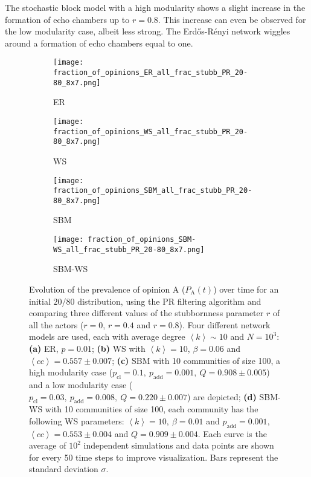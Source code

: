 \documentclass[11 pt , letterpaper , twoside , openright]{book}
\begin{document}
\newline
The stochastic block model with a high modularity shows a slight increase in the formation of echo chambers up to $r = 0.8$. This increase can even be observed for the low modularity case, albeit less strong. The Erd\H{o}s-R\'{e}nyi network wiggles around a formation of echo chambers equal to one.
\newpage
\begin{figure}[H]
  \begin{subfigure}[b]{0.49\textwidth}
    \caption{ER}
  	\texttt{[image: fraction\_of\_opinions\_ER\_all\_frac\_stubb\_PR\_20-80\_8x7.png]}
  \end{subfigure}
  \begin{subfigure}[b]{0.49\textwidth}
    \caption{WS}
  	\texttt{[image: fraction\_of\_opinions\_WS\_all\_frac\_stubb\_PR\_20-80\_8x7.png]}
  \end{subfigure}
  \begin{subfigure}[b]{0.49\textwidth}
    \caption{SBM}
    \texttt{[image: fraction\_of\_opinions\_SBM\_all\_frac\_stubb\_PR\_20-80\_8x7.png]}
  \end{subfigure}
  \begin{subfigure}[b]{0.49\textwidth}
    \caption{SBM-WS}
    \texttt{[image: fraction\_of\_opinions\_SBM-WS\_all\_frac\_stubb\_PR\_20-80\_8x7.png]}
  \end{subfigure}
  \captionsetup{format=plain}
  \caption[Evolution of the prevalence of opinion A ($P_\text{A}(t)$) over time for an initial $20/80$ opinion distribution, using the PR filtering algorithm and comparing three different values of the stubbornness parameter $r$ of all the actors ($r = 0$, $r = 0.4$ and $r = 0.8$).]{Evolution of the prevalence of opinion A ($P_\text{A}(t)$) over time for an initial $20/80$ distribution, using the PR filtering algorithm and comparing three different values of the stubbornness parameter $r$ of all the actors ($r = 0$, $r = 0.4$ and $r = 0.8$). Four different network models are used, each with average degree $\left<k\right> \sim 10$ and $N = 10^3$: \textbf{(a)} ER, $p=0.01$; \textbf{(b)} WS with $\left<k\right> = 10$, $\beta = 0.06$ and $\left<cc\right> = 0.557 \pm 0.007$; \textbf{(c)} SBM with 10 communities of size 100, a high modularity case ($p_{\text{cl}} = 0.1,\ p_{\text{add}} = 0.001,\ Q = 0.908 \pm 0.005$) and a low modularity case ($p_{\text{cl}} = 0.03,\ p_{\text{add}} = 0.008,\ Q = 0.220 \pm 0.007$) are depicted; \textbf{(d)} SBM-WS with 10 communities of size 100, each community has the following WS parameters: $\left<k\right> = 10,\ \beta = 0.01$ and $p_{\text{add}} = 0.001$, $\left<cc\right> = 0.553 \pm 0.004$ and $Q = 0.909 \pm 0.004$. Each curve is the average of $10^2$ independent simulations and data points are shown for every 50 time steps to improve visualization. Bars represent the standard deviation $\sigma$.}%
\label{ev_op_20_80_all_frac_stubb_PR}
\end{figure}
\end{document}
